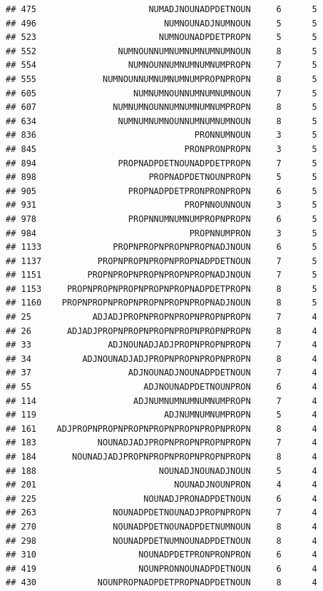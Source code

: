 \documentclass[]{article}
\begin{document}
\begin{verbatim}
## 475                      NUMADJNOUNADPDETNOUN     6      5
## 496                         NUMNOUNADJNUMNOUN     5      5
## 523                        NUMNOUNADPDETPROPN     5      5
## 552                NUMNOUNNUMNUMNUMNUMNUMNOUN     8      5
## 554                  NUMNOUNNUMNUMNUMNUMPROPN     7      5
## 555             NUMNOUNNUMNUMNUMNUMPROPNPROPN     8      5
## 605                   NUMNUMNOUNNUMNUMNUMNOUN     7      5
## 607               NUMNUMNOUNNUMNUMNUMNUMPROPN     8      5
## 634                NUMNUMNUMNOUNNUMNUMNUMNOUN     8      5
## 836                               PRONNUMNOUN     3      5
## 845                             PRONPRONPROPN     3      5
## 894                PROPNADPDETNOUNADPDETPROPN     7      5
## 898                      PROPNADPDETNOUNPROPN     5      5
## 905                  PROPNADPDETPRONPRONPROPN     6      5
## 931                             PROPNNOUNNOUN     3      5
## 978                  PROPNNUMNUMNUMPROPNPROPN     6      5
## 984                              PROPNNUMPRON     3      5
## 1133              PROPNPROPNPROPNPROPNADJNOUN     6      5
## 1137           PROPNPROPNPROPNPROPNADPDETNOUN     7      5
## 1151         PROPNPROPNPROPNPROPNPROPNADJNOUN     7      5
## 1153     PROPNPROPNPROPNPROPNPROPNADPDETPROPN     8      5
## 1160    PROPNPROPNPROPNPROPNPROPNPROPNADJNOUN     8      5
## 25            ADJADJPROPNPROPNPROPNPROPNPROPN     7      4
## 26       ADJADJPROPNPROPNPROPNPROPNPROPNPROPN     8      4
## 33               ADJNOUNADJADJPROPNPROPNPROPN     7      4
## 34          ADJNOUNADJADJPROPNPROPNPROPNPROPN     8      4
## 37                   ADJNOUNADJNOUNADPDETNOUN     7      4
## 55                      ADJNOUNADPDETNOUNPRON     6      4
## 114                   ADJNUMNUMNUMNUMNUMPROPN     7      4
## 119                         ADJNUMNUMNUMPROPN     5      4
## 161    ADJPROPNPROPNPROPNPROPNPROPNPROPNPROPN     8      4
## 183            NOUNADJADJPROPNPROPNPROPNPROPN     7      4
## 184       NOUNADJADJPROPNPROPNPROPNPROPNPROPN     8      4
## 188                        NOUNADJNOUNADJNOUN     5      4
## 201                           NOUNADJNOUNPRON     4      4
## 225                     NOUNADJPRONADPDETNOUN     6      4
## 263               NOUNADPDETNOUNADJPROPNPROPN     7      4
## 270               NOUNADPDETNOUNADPDETNUMNOUN     8      4
## 298               NOUNADPDETNUMNOUNADPDETNOUN     8      4
## 310                    NOUNADPDETPRONPRONPRON     6      4
## 419                    NOUNPRONNOUNADPDETNOUN     6      4
## 430            NOUNPROPNADPDETPROPNADPDETNOUN     8      4

\end{verbatim}
\end{document}

